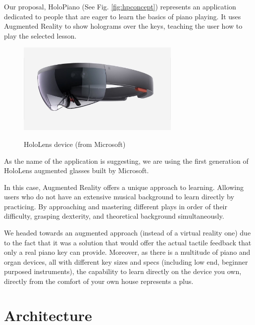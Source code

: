 \documentclass[12 pct]{report}
\begin{document}
Our proposal, HoloPiano (See Fig. \ref{fig:hpconcept}) represents an application dedicated to people that are eager to learn the basics of piano playing. 
It uses Augmented Reality to show holograms over the keys, teaching the user how to play the selected lesson.


\begin{figure}[H]
\includegraphics[width=0.7\textwidth]{hololens}
\centering
\label{fig:hololens}
\caption{HoloLens device (from Microsoft)}
\end{figure}

As the name of the application is suggesting, we are using the first generation of HoloLens augmented glasses built by Microsoft.

In this case, Augmented Reality offers a unique approach to learning. 
Allowing users who do not have an extensive musical background to learn directly by practicing. 
By approaching and mastering different plays in order of their difficulty, grasping dexterity, and theoretical background simultaneously.

We headed towards an augmented approach (instead of a virtual reality one) due to the fact that it was a solution that would offer the actual tactile feedback that only a real piano key can provide. 
Moreover, as there is a multitude of piano and organ devices, all with different key sizes and specs (including low end, beginner purposed instruments), the capability to learn directly on the device you own, directly from the comfort of your own house represents a plus.

\section{Architecture}
\end{document}
